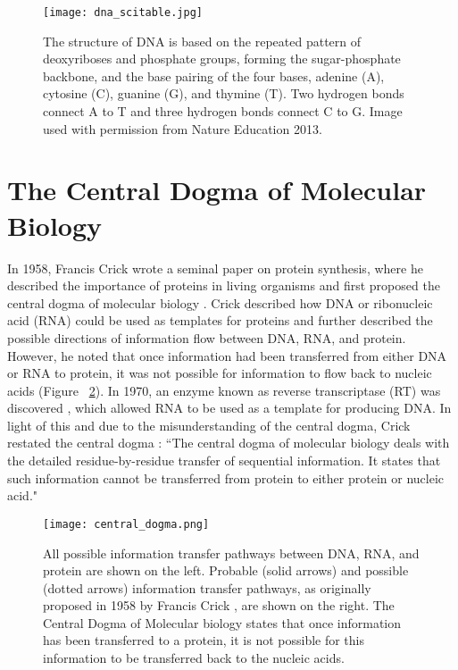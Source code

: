 \begin{figure}[!ht]
   \centering
   \texttt{[image: dna\_scitable.jpg]}
   \caption[DNA base pairing]{The structure of DNA is based on the repeated pattern of deoxyriboses and phosphate groups, forming the sugar-phosphate backbone, and the base pairing of the four bases, adenine (A), cytosine (C), guanine (G), and thymine (T). Two hydrogen bonds connect A to T and three hydrogen bonds connect C to G. Image used with permission from Nature Education 2013.}
   \label{fig:dna}
\end{figure}

\section{The Central Dogma of Molecular Biology}
\label{sec:central_dogma}

In 1958, Francis Crick wrote a seminal paper on protein synthesis, where he described the importance of proteins in living organisms and first proposed the central dogma of molecular biology \citep{crick1958protein}. Crick described how DNA or ribonucleic acid (RNA) could be used as templates for proteins and further described the possible directions of information flow between DNA, RNA, and protein. However, he noted that once information had been transferred from either DNA or RNA to protein, it was not possible for information to flow back to nucleic acids (Figure ~\ref{fig:central_dogma}). In 1970, an enzyme known as reverse transcriptase (RT) was discovered \citep{pmid4316301,pmid4316300}, which allowed RNA to be used as a template for producing DNA. In light of this and due to the misunderstanding of the central dogma, Crick restated the central dogma \citep{CRICK1970}: ``The central dogma of molecular biology deals with the detailed residue-by-residue transfer of sequential information. It states that such information cannot be transferred from protein to either protein or nucleic acid."

\begin{figure}[!ht]
   \centering
   \texttt{[image: central\_dogma.png]}
   \caption[The central dogma]{All possible information transfer pathways between DNA, RNA, and protein are shown on the left. Probable (solid arrows) and possible (dotted arrows) information transfer pathways, as originally proposed in 1958 by Francis Crick \citep{crick1958protein}, are shown on the right. The Central Dogma of Molecular biology states that once information has been transferred to a protein, it is not possible for this information to be transferred back to the nucleic acids.}
   \label{fig:central_dogma}
\end{figure}

